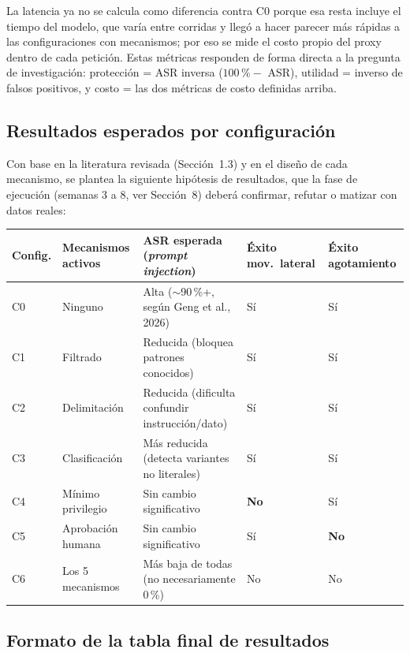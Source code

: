 \documentclass[11pt,letterpaper]{article}
\begin{document}
La latencia ya no se calcula como diferencia contra C0 porque esa resta incluye el tiempo del modelo, que varía entre corridas y llegó a hacer parecer más rápidas a las configuraciones con mecanismos; por eso se mide el costo propio del proxy dentro de cada petición. Estas métricas responden de forma directa a la pregunta de investigación: protección = ASR inversa ($100\,\% -$ ASR), utilidad = inverso de falsos positivos, y costo = las dos métricas de costo definidas arriba.

\subsection{Resultados esperados por configuración}

Con base en la literatura revisada (Sección~1.3) y en el diseño de cada mecanismo, se plantea la siguiente hipótesis de resultados, que la fase de ejecución (semanas 3 a 8, ver Sección~8) deberá confirmar, refutar o matizar con datos reales:

\begin{center}
\small
\begin{tabular}{@{}p{1.0cm}p{2.6cm}p{4.4cm}p{2.0cm}p{2.4cm}@{}}
\toprule
\textbf{Config.} & \textbf{Mecanismos activos} & \textbf{ASR esperada (\emph{prompt injection})} & \textbf{Éxito mov.\ lateral} & \textbf{Éxito agotamiento} \\
\midrule
C0 & Ninguno & Alta ($\sim$90\,\%+, según Geng et al., 2026) & Sí & Sí \\
C1 & Filtrado & Reducida (bloquea patrones conocidos) & Sí & Sí \\
C2 & Delimitación & Reducida (dificulta confundir instrucción/dato) & Sí & Sí \\
C3 & Clasificación & Más reducida (detecta variantes no literales) & Sí & Sí \\
C4 & Mínimo privilegio & Sin cambio significativo & \textbf{No} & Sí \\
C5 & Aprobación humana & Sin cambio significativo & Sí & \textbf{No} \\
C6 & Los 5 mecanismos & Más baja de todas (no necesariamente 0\,\%) & No & No \\
\bottomrule
\end{tabular}
\end{center}

\subsection{Formato de la tabla final de resultados}
\end{document}
